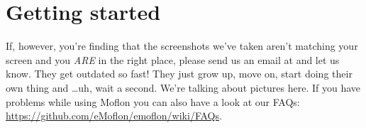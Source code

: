\section{Getting started}
\genHeader 

If, however, you're finding that the screenshots we've taken aren't matching your screen and you \emph{ARE} in the right place, please send us an email at
\eMoflonContact{} and let us know. They get outdated so fast! They just grow up, move on, start doing their own thing and
\ldots uh, wait a second. We're talking about pictures here.
\newline
If you have problems while using Moflon you can also have a look at our FAQs: \href{https://github.com/eMoflon/emoflon/wiki/FAQs}{https://github.com/eMoflon/emoflon/wiki/FAQs}.